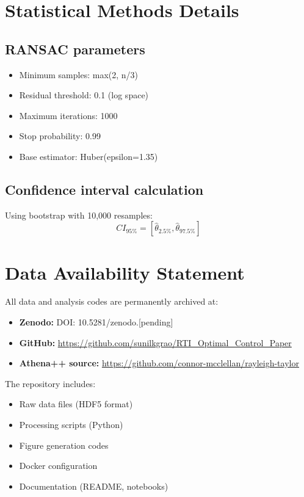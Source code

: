 \documentclass[aps,pre,twocolumn,superscriptaddress]{revtex4-2}
\begin{document}
\section{Statistical Methods Details}

\subsection{RANSAC parameters}

\begin{itemize}
\item Minimum samples: max(2, n/3)
\item Residual threshold: 0.1 (log space)
\item Maximum iterations: 1000
\item Stop probability: 0.99
\item Base estimator: Huber(epsilon=1.35)
\end{itemize}

\subsection{Confidence interval calculation}

Using bootstrap with 10,000 resamples:
\begin{equation}
CI_{95\%} = [\hat{\theta}_{2.5\%}, \hat{\theta}_{97.5\%}]
\end{equation}

\section{Data Availability Statement}

All data and analysis codes are permanently archived at:

\begin{itemize}
\item \textbf{Zenodo:} DOI: 10.5281/zenodo.[pending]
\item \textbf{GitHub:} \url{https://github.com/sunilkgrao/RTI_Optimal_Control_Paper}
\item \textbf{Athena++ source:} \url{https://github.com/connor-mcclellan/rayleigh-taylor}
\end{itemize}

The repository includes:
\begin{itemize}
\item Raw data files (HDF5 format)
\item Processing scripts (Python)
\item Figure generation codes
\item Docker configuration
\item Documentation (README, notebooks)
\end{itemize}
\end{document}
